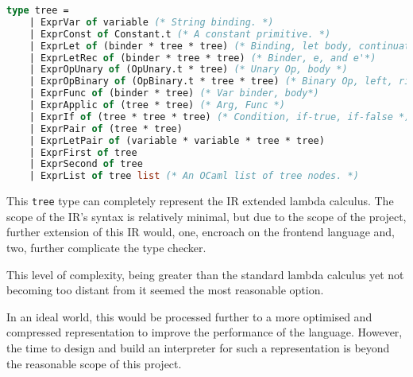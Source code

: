 \documentclass{l4proj}
\begin{document}
\clearpage
\begin{lstlisting}[language=Caml, breaklines=false, label=ir-ast, caption=The Abstract Syntax for PyFunc's IR written in OCaml.]
type tree = 
    | ExprVar of variable (* String binding. *)
    | ExprConst of Constant.t (* A constant primitive. *)
    | ExprLet of (binder * tree * tree) (* Binding, let body, continuation. *)
    | ExprLetRec of (binder * tree * tree) (* Binder, e, and e'*)
    | ExprOpUnary of (OpUnary.t * tree) (* Unary Op, body *)
    | ExprOpBinary of (OpBinary.t * tree * tree) (* Binary Op, left, right *)
    | ExprFunc of (binder * tree) (* Var binder, body*)
    | ExprApplic of (tree * tree) (* Arg, Func *)
    | ExprIf of (tree * tree * tree) (* Condition, if-true, if-false *)
    | ExprPair of (tree * tree)
    | ExprLetPair of (variable * variable * tree * tree)
    | ExprFirst of tree
    | ExprSecond of tree
    | ExprList of tree list (* An OCaml list of tree nodes. *)
\end{lstlisting}


This \texttt{tree} type can completely represent the IR extended lambda calculus. 
The scope of the IR's syntax is relatively minimal, but due to the scope of the project, further extension of this IR would, one, encroach on the frontend language and, two, further complicate the type checker.

This level of complexity, being greater than the standard lambda calculus yet not becoming too distant from it seemed the most reasonable option.

In an ideal world, this would be processed further to a more optimised and compressed representation to improve the performance of the language.
However, the time to design and build an interpreter for such a representation is beyond the reasonable scope of this project.
\end{document}
